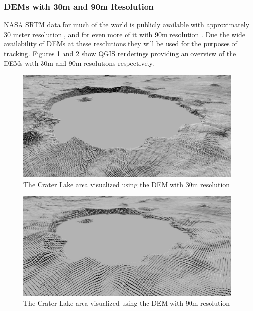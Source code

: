 \documentclass[journal]{IEEEtran}
\begin{document}
\subsubsection{DEMs with 30m and 90m Resolution} \label{dem30m90m}
NASA SRTM data for much of the world is publicly available with approximately 30 meter resolution \cite{jpl13}, and for even more of it with 90m resolution \cite{nasa00}. Due the wide availability of DEMs at these resolutions they will be used for the purposes of tracking. Figures \ref{fig:craterlake_30m} and \ref{fig:craterlake_90m} show QGIS \cite{qgis} renderings providing an overview of the DEMs with 30m and 90m resolutions respectively. 

\begin{figure}[ht]
    \centering
    \includegraphics[scale=0.15]{craterlake_30m.png}
    \caption{The Crater Lake area visualized using the DEM with 30m resolution}
    \label{fig:craterlake_30m}
\end{figure}

\begin{figure}[ht]
    \centering
    \includegraphics[scale=0.15]{craterlake_90m.png}
    \caption{The Crater Lake area visualized using the DEM with 90m resolution}
    \label{fig:craterlake_90m}
\end{figure}
\end{document}
